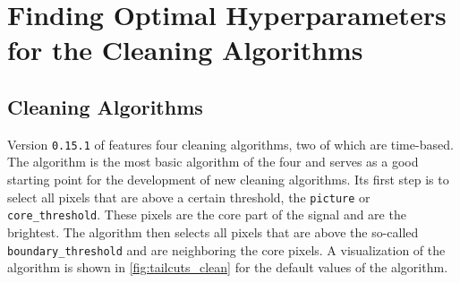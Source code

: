 \chapter{Finding Optimal Hyperparameters for the Cleaning Algorithms}
\label{ch:finding-hyperparams}

\section{Cleaning Algorithms}
\label{sec:cleaning-algorithms}

Version \texttt{0.15.1} of \ctapipe{} features four cleaning algorithms, two of which are time-based.
The \tailcuts{} algorithm is the most basic algorithm of the four and serves as a good
starting point for the development of new cleaning algorithms. Its first step is to select all
pixels that are above a certain threshold, the \texttt{picture} or \texttt{core\_threshold}. These
pixels are the core part of the signal and are the brightest. The \tailcuts{} algorithm
then selects all pixels that are above the so-called \texttt{boundary\_threshold} and are neighboring
the core pixels. A visualization of the algorithm is shown in \autoref{fig:tailcuts_clean} for the
default values of the algorithm.

